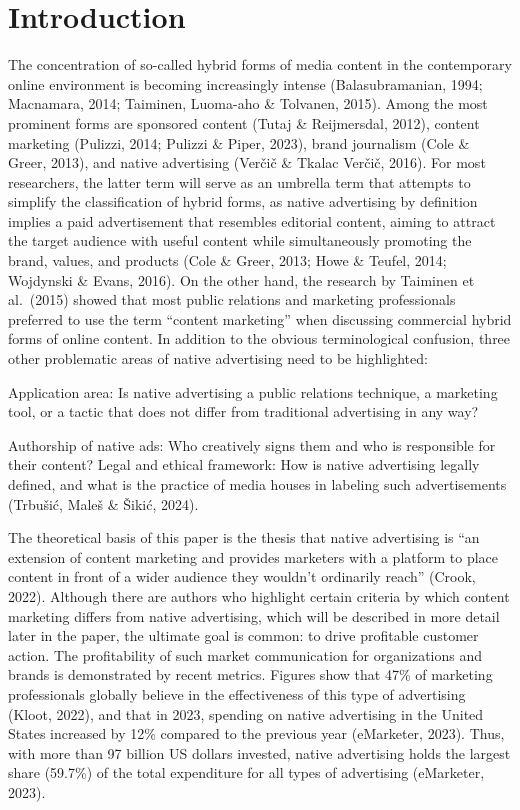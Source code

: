 \documentclass[preprint, 3p,
authoryear]{elsarticle} %
\begin{document}
\begin{frontmatter}
 \end{frontmatter}

\hypertarget{introduction}{%
\section{Introduction}\label{introduction}}

The concentration of so-called hybrid forms of media content in the
contemporary online environment is becoming increasingly intense
(Balasubramanian, 1994; Macnamara, 2014; Taiminen, Luoma-aho \&
Tolvanen, 2015). Among the most prominent forms are sponsored content
(Tutaj \& Reijmersdal, 2012), content marketing (Pulizzi, 2014; Pulizzi
\& Piper, 2023), brand journalism (Cole \& Greer, 2013), and native
advertising (Verčič \& Tkalac Verčič, 2016). For most researchers, the
latter term will serve as an umbrella term that attempts to simplify the
classification of hybrid forms, as native advertising by definition
implies a paid advertisement that resembles editorial content, aiming to
attract the target audience with useful content while simultaneously
promoting the brand, values, and products (Cole \& Greer, 2013; Howe \&
Teufel, 2014; Wojdynski \& Evans, 2016). On the other hand, the research
by Taiminen et al.~(2015) showed that most public relations and
marketing professionals preferred to use the term ``content marketing''
when discussing commercial hybrid forms of online content. In addition
to the obvious terminological confusion, three other problematic areas
of native advertising need to be highlighted:

Application area: Is native advertising a public relations technique, a
marketing tool, or a tactic that does not differ from traditional
advertising in any way?

Authorship of native ads: Who creatively signs them and who is
responsible for their content? Legal and ethical framework: How is
native advertising legally defined, and what is the practice of media
houses in labeling such advertisements (Trbušić, Maleš \& Šikić, 2024).

The theoretical basis of this paper is the thesis that native
advertising is ``an extension of content marketing and provides
marketers with a platform to place content in front of a wider audience
they wouldn't ordinarily reach'' (Crook, 2022). Although there are
authors who highlight certain criteria by which content marketing
differs from native advertising, which will be described in more detail
later in the paper, the ultimate goal is common: to drive profitable
customer action. The profitability of such market communication for
organizations and brands is demonstrated by recent metrics. Figures show
that 47\% of marketing professionals globally believe in the
effectiveness of this type of advertising (Kloot, 2022), and that in
2023, spending on native advertising in the United States increased by
12\% compared to the previous year (eMarketer, 2023). Thus, with more
than 97 billion US dollars invested, native advertising holds the
largest share (59.7\%) of the total expenditure for all types of
advertising (eMarketer, 2023).
\end{document}
